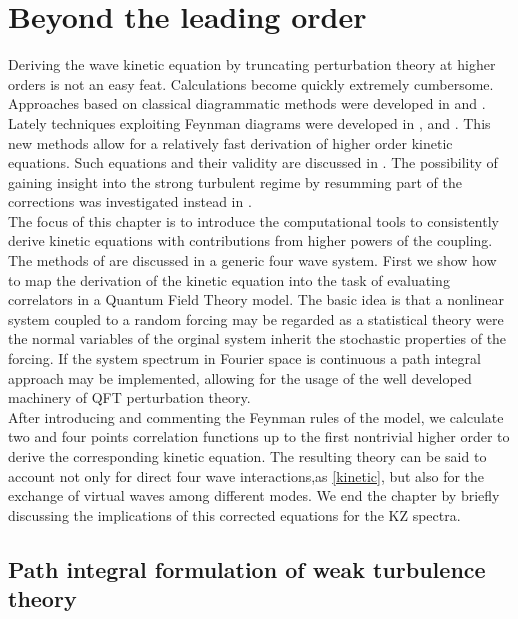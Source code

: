
\newpage
\vphantom{}
\section{Beyond the leading order}
Deriving the wave kinetic equation by truncating perturbation theory at higher orders is not an easy feat. Calculations become quickly extremely cumbersome. Approaches 
based on classical diagrammatic methods were developed in \cite{Zakharov1975} and \cite{Gurarie:1994ut}. Lately techniques exploiting Feynman diagrams were developed in
\cite{Rosenhaus2023}, \cite{Rosenhaus:2022uwa} and \cite{Rosenhaus:2023sik}. This new methods allow for a relatively fast derivation of higher order kinetic equations.
Such equations and their validity are discussed in \cite{Rosenhaus:2023pdj}. The possibility of gaining insight into the strong turbulent regime by resumming 
part of the corrections was investigated instead in \cite{Rosenhaus:2025mgj}. \\
The focus of this chapter is to introduce the computational tools to consistently derive kinetic equations with contributions from higher powers of the coupling. 
The methods of \cite{Rosenhaus2023} are discussed in a generic four wave system. First we show how to map the derivation of the kinetic equation into
the task of evaluating correlators in a Quantum Field Theory model. The basic idea is that a nonlinear system coupled to a random forcing may be regarded as 
a statistical theory were the normal variables of the orginal system inherit the stochastic properties of the forcing. If the system spectrum in Fourier space is continuous
a path integral approach may be implemented, allowing for the usage of the well developed machinery of QFT perturbation theory.\\
After introducing and commenting the Feynman rules of the model, we calculate two and four points 
correlation functions up to the first nontrivial higher order to derive the corresponding kinetic equation. The resulting theory can be said to account 
not only for direct four wave interactions,as \eqref{kinetic}, but also for the exchange of virtual waves among different modes. We end the chapter by briefly discussing the implications
of this corrected equations for the KZ spectra. \\  
\subsection{Path integral formulation of weak turbulence theory}

